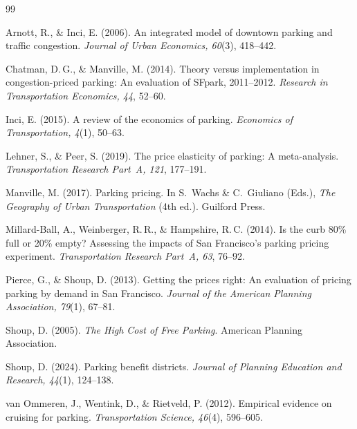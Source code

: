 \documentclass[11pt, letterpaper]{article}
\begin{document}
\begin{thebibliography}{99}

Arnott, R., \& Inci, E. (2006).
An integrated model of downtown parking and traffic congestion.
\textit{Journal of Urban Economics, 60}(3), 418--442.

Chatman, D.\,G., \& Manville, M. (2014).
Theory versus implementation in congestion-priced parking: An evaluation of
SFpark, 2011--2012.
\textit{Research in Transportation Economics, 44}, 52--60.

Inci, E. (2015).
A review of the economics of parking.
\textit{Economics of Transportation, 4}(1), 50--63.

Lehner, S., \& Peer, S. (2019).
The price elasticity of parking: A meta-analysis.
\textit{Transportation Research Part~A, 121}, 177--191.

Manville, M. (2017).
Parking pricing.
In S.\ Wachs \& C.\ Giuliano (Eds.),
\textit{The Geography of Urban Transportation} (4th ed.). Guilford Press.

Millard-Ball, A., Weinberger, R.\,R., \& Hampshire, R.\,C. (2014).
Is the curb 80\% full or 20\% empty? Assessing the impacts of San Francisco's
parking pricing experiment.
\textit{Transportation Research Part~A, 63}, 76--92.

Pierce, G., \& Shoup, D. (2013).
Getting the prices right: An evaluation of pricing parking by demand in San
Francisco.
\textit{Journal of the American Planning Association, 79}(1), 67--81.

Shoup, D. (2005).
\textit{The High Cost of Free Parking}.
American Planning Association.

Shoup, D. (2024).
Parking benefit districts.
\textit{Journal of Planning Education and Research, 44}(1), 124--138.

van Ommeren, J., Wentink, D., \& Rietveld, P. (2012).
Empirical evidence on cruising for parking.
\textit{Transportation Science, 46}(4), 596--605.

\end{thebibliography}
\end{document}
